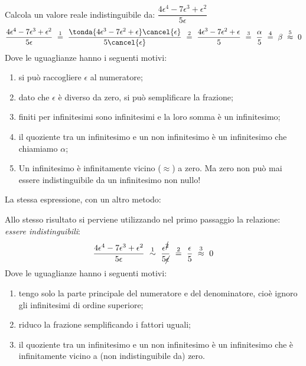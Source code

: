 \begin{esempio}
Calcola un valore reale indistinguibile da: \quad
\(\dfrac{4 \epsilon^4 -7 \epsilon^3 + \epsilon^2}{5 \epsilon}\)
\[\dfrac{4 \epsilon^4 -7 \epsilon^3 + \epsilon^2}{5 \epsilon} 
~ \stackrel{1}{=} ~
  \dfrac{\tonda{4 \epsilon^3 -7 \epsilon^2 + \epsilon} \cancel{\epsilon}}
                    {5 \cancel{\epsilon}} 
~ \stackrel{2}{=} ~ 
  \dfrac{4 \epsilon^3 -7 \epsilon^2 + \epsilon}{5}
~ \stackrel{3}{=} ~
  \dfrac{\alpha}{5}
~ \stackrel{4}{=} ~
  \beta
~ \stackrel{5}{\approx} ~
  0\]
Dove le uguaglianze hanno i seguenti motivi:
\begin{enumerate} [nosep]
 \item si può raccogliere \(\epsilon\) al numeratore; 
 \item dato che \(\epsilon\) è diverso da zero, si può semplificare la 
frazione; 
 \item finiti per infinitesimi sono infinitesimi e la loro
somma è un infinitesimo;
 \item il quoziente tra un infinitesimo e un non infinitesimo è un 
infinitesimo che chiamiamo \(\alpha\);
 \item Un infinitesimo è infinitamente vicino (\(\approx\)) a zero. 
Ma zero non può mai essere indistinguibile da un infinitesimo non nullo!
\end{enumerate}
\end{esempio}

\begin{esempio}
La stessa espressione, con un altro metodo:

Allo stesso risultato si perviene utilizzando nel primo passaggio la 
relazione: \emph{essere indistinguibili}:
\[\dfrac{4 \epsilon^4 -7 \epsilon^3 + \epsilon^2}{5 \epsilon} 
~ \stackrel{1}{\sim} ~
  \dfrac{\epsilon^{\cancel{2}}}{5 \cancel{\epsilon}} 
~ \stackrel{2}{=} ~
  \dfrac{\epsilon}{5}
~ \stackrel{3}{\approx} ~
  0\]
Dove le uguaglianze hanno i seguenti motivi:
\begin{enumerate} [nosep]
 \item tengo solo la parte principale del numeratore e del denominatore, 
cioè ignoro gli infinitesimi di ordine superiore; 
 \item riduco la frazione semplificando i fattori uguali; 
 \item il quoziente tra un infinitesimo e un non infinitesimo è un 
infinitesimo che è infinitamente vicino a (non indistinguibile da) zero.
\end{enumerate}
\end{esempio}

